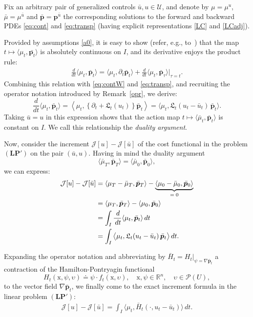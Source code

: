 \documentclass[sn-mathphys-num]{sn-jnl}
\numberwithin{equation}{section}
\theoremstyle{mythm}
\theoremstyle{mydef}
\renewcommand{\d}{\,d}
\renewcommand{\mathbf}[1]{\bm{#1}}
\begin{document}
Fix an arbitrary pair of generalized controls $\bar u, u \in \mathcal U$, and denote by $\mu = \mu^u$,  $\bar \mu = \mu^{\bar u}$ and $\bar{\bm p} =\bm p^{\bar u}$ the corresponding solutions to the forward and backward PDEs \eqref{eq:cont} and \eqref{eq:transp} (having explicit representations \eqref{LC} and \eqref{LCadj}). 

Provided by assumptions \ref{a0}, it is easy to show (refer, e.g., to~\cite{pogodaevExactFormulaeIncrement2024}) that the map
\(
    t \mapsto \langle \mu_t, \bar{\bm p_t} \rangle
\)
is absolutely continuous on $I$, and its derivative enjoys the product rule:
\begin{align}\label{prodr}
    \frac{d}{dt}\langle \mu_t, \bar{\bm p}_t \rangle = \langle \mu_t, \partial_t \bar{\bm p}_t\rangle + \frac{d}{dt}\langle \mu_t, \bar{\bm p}_\tau \rangle\Big|_{\tau = t}.
\end{align}
Combining this relation with \eqref{eq:contW} and \eqref{eq:transp}, and recruiting the operator notation introduced by Remark~\ref{opr}, we derive:
\[
        \frac{d}{dt}\langle \mu_t, \bar{\bm p}_t \rangle = \left\langle\mu_t, \left\{\partial_t + \mathfrak L_t(u_t)\right\} \bar{\bm p}_t \right \rangle = \big\langle \mu_t, \mathfrak{L}_t(u_t - \bar u_t) \,  \bar{\bm{p}}_t \big\rangle.
\]
Taking $\bar u = u$ in this expression shows that the action map $t \mapsto \langle \bar \mu_t, \bar{\bm p}_t \rangle$ is constant on $I$. We call this relationship the \emph{duality argument}.

Now, consider the increment 
$\mathcal J[u] - \mathcal J[\bar u] $
of the cost functional in the problem $(\bm{LP}')$ on the pair $(\bar u, u)$. Having in mind the duality argument 
\[
    \langle \bar{\mu}_T, \bar{\bm p}_T\rangle = \langle \bar{\mu}_0, \bar{\bm p}_0\rangle,
\]
we can express: 
\begin{align*}
\mathcal J[u] - \mathcal J[\bar u] & = \langle \mu_T - \bar{\mu}_T, \bar{\bm p}_T\rangle - \underbrace{\langle\mu_0 - \bar{\mu}_0, \bar{\bm p}_0\rangle}_\text{$ = 0$}\\
&= \langle \mu_T, \bar{\bm p}_T\rangle - \langle \mu_0, \bar{\bm p}_0\rangle\\
&= \int_I \frac{\d}{\d{t}} \langle \mu_t, \bar{\bm p}_t\rangle \d t\\
& = \int_I \big\langle \mu_t, \mathfrak{L}_t(u_t - \bar u_t) \,  \bar{\bm{p}}_t \big\rangle \d t.
\end{align*}

Expanding the operator notation and abbreviating by \(\bar{H}_t = H_t\big|_{\psi = \nabla\bar{\bm p}_t}\) a contraction of the Hamilton-Pontryagin functional %
\[
H_t({\mathrm x},\psi,\upsilon) \doteq \psi \cdot f_t({\mathrm x},\upsilon), \quad {\mathrm x}, \psi \in \mathbb{R}^n, \quad \upsilon\in \mathcal P(U),
\]
to the vector field $\nabla\bar{\bm p}_t$, we finally come to the exact increment formula in the linear problem \((\mathbf{LP}')\): 
\begin{align}\label{eq:LCexact}
  \mathcal J[u] - \mathcal J[\bar{u}]
    = \int_I \big\langle\mu_t, \bar{H}_t(\cdot, u_t - \bar{u}_t)\big\rangle \d t.
\end{align}
\end{document}
